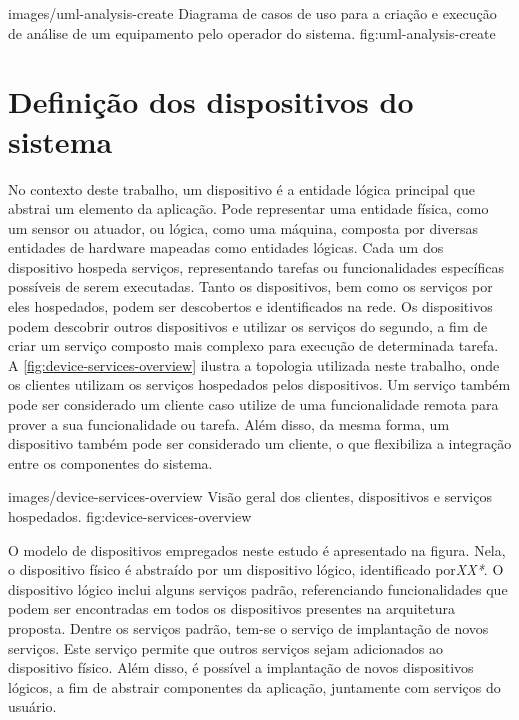     {images/uml-analysis-create}
    {Diagrama de casos de uso para a criação e execução de análise de um equipamento pelo operador
        do sistema.}
    {fig:uml-analysis-create}



\section{Definição dos dispositivos do sistema}

No contexto deste trabalho, um dispositivo é a entidade lógica principal que abstrai um elemento da
aplicação. Pode representar uma entidade física, como um sensor ou atuador, ou lógica, como uma
máquina, composta por diversas entidades de hardware mapeadas como entidades lógicas. Cada um dos
dispositivo hospeda serviços, representando tarefas ou funcionalidades específicas possíveis de
serem executadas. Tanto os dispositivos, bem como os serviços por eles hospedados, podem ser
descobertos e identificados na rede. Os dispositivos podem descobrir outros dispositivos e utilizar
os serviços do segundo, a fim de criar um serviço composto mais complexo para execução de
determinada tarefa. A \cref{fig:device-services-overview} ilustra a topologia utilizada neste
trabalho, onde os clientes utilizam os serviços hospedados pelos dispositivos. Um serviço também
pode ser considerado um cliente caso utilize de uma funcionalidade remota para prover a sua
funcionalidade ou tarefa. Além disso, da mesma forma, um dispositivo também pode ser considerado um
cliente, o que flexibiliza a integração entre os componentes do sistema.

    {images/device-services-overview}
    {Visão geral dos clientes, dispositivos e serviços hospedados.}
    {fig:device-services-overview}

O modelo de dispositivos empregados neste estudo é apresentado na figura. Nela,
o dispositivo físico é abstraído por um dispositivo lógico, identificado por\textit{XX*}. O
dispositivo lógico inclui alguns serviços padrão, referenciando funcionalidades que podem ser
encontradas em todos os dispositivos presentes na arquitetura proposta. Dentre os serviços padrão,
tem-se o serviço de implantação de novos serviços. Este serviço permite que outros serviços sejam
adicionados ao dispositivo físico. Além disso, é possível a implantação de novos dispositivos
lógicos, a fim de abstrair componentes da aplicação, juntamente com serviços do
usuário.


